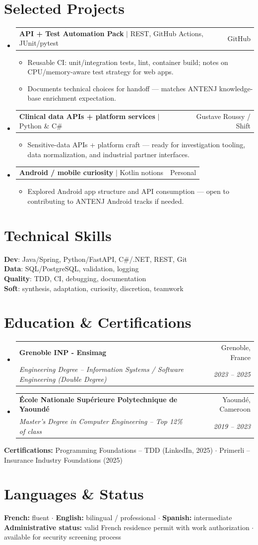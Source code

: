 \documentclass[letterpaper,10.5pt]{article}
\makeatletter
\newcommand{\resumeItem}[1]{\item\small{#1 \vspace{-1.5pt}}}
\newcommand{\resumeSubheading}[4]{\vspace{-1pt}\item\begin{tabular*}{0.97\textwidth}[t]{l@{\extracolsep{\fill}}r}\textbf{#1} & #2 \\\textit{\small#3} & \textit{\small #4} \\\end{tabular*}\vspace{-5pt}}
\newcommand{\resumeProjectHeading}[2]{\item\begin{tabular*}{0.97\textwidth}{l@{\extracolsep{\fill}}r}\small#1 & #2 \\\end{tabular*}\vspace{-5pt}}
\newcommand{\resumeSubHeadingListStart}{\begin{itemize}[leftmargin=0.15in, label={}]}
\newcommand{\resumeSubHeadingListEnd}{\end{itemize}}
\newcommand{\resumeItemListStart}{\begin{itemize}[leftmargin=0.18in]}
\newcommand{\resumeItemListEnd}{\end{itemize}\vspace{-3pt}}
\makeatother
\begin{document}
\section{Selected Projects}
\resumeSubHeadingListStart
  \resumeProjectHeading{\textbf{API + Test Automation Pack} $|$ REST, GitHub Actions, JUnit/pytest}{GitHub}
    \resumeItemListStart
      \resumeItem{Reusable CI: unit/integration tests, lint, container build; notes on CPU/memory-aware test strategy for web apps.}
      \resumeItem{Documents technical choices for handoff --- matches ANTENJ knowledge-base enrichment expectation.}
    \resumeItemListEnd
  \resumeProjectHeading{\textbf{Clinical data APIs + platform services} $|$ Python \& C\#}{Gustave Roussy / Shift}
    \resumeItemListStart
      \resumeItem{Sensitive-data APIs + platform craft --- ready for investigation tooling, data normalization, and industrial partner interfaces.}
    \resumeItemListEnd
  \resumeProjectHeading{\textbf{Android / mobile curiosity} $|$ Kotlin notions}{Personal}
    \resumeItemListStart
      \resumeItem{Explored Android app structure and API consumption --- open to contributing to ANTENJ Android tracks if needed.}
    \resumeItemListEnd
\resumeSubHeadingListEnd
\section{Technical Skills}
\begin{itemize}[leftmargin=0.15in, label={}]\small{\item{
\textbf{Dev}: Java/Spring, Python/FastAPI, C\#/.NET, REST, Git \\
\textbf{Data}: SQL/PostgreSQL, validation, logging \\
\textbf{Quality}: TDD, CI, debugging, documentation \\
\textbf{Soft}: synthesis, adaptation, curiosity, discretion, teamwork
}}\end{itemize}
\section{Education \& Certifications}
\resumeSubHeadingListStart
  \resumeSubheading{Grenoble INP - Ensimag}{Grenoble, France}{Engineering Degree -- Information Systems / Software Engineering (Double Degree)}{2023 -- 2025}
  \resumeSubheading{\'Ecole Nationale Sup\'erieure Polytechnique de Yaound\'e}{Yaound\'e, Cameroon}{Master's Degree in Computer Engineering -- Top 12\% of class}{2019 -- 2023}
\resumeSubHeadingListEnd
\small{\textbf{Certifications:} Programming Foundations -- TDD (LinkedIn, 2025) $\cdot$ Primerli -- Insurance Industry Foundations (2025)}
\section{Languages \& Status}
\small{\textbf{French:} fluent $\cdot$ \textbf{English:} bilingual / professional $\cdot$ \textbf{Spanish:} intermediate \\ \textbf{Administrative status:} valid French residence permit with work authorization $\cdot$ available for security screening process}
\end{document}
